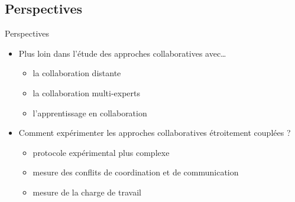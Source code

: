\documentclass[english,french,dvips,10pt]{mybeamer}
\begin{document}
	\subsection{Perspectives}
	\begin{myframe}[label={fra-Perspectives}]{Perspectives}
		\begin{itemize}
				\vfill
			\item Plus loin dans l'étude des approches collaboratives avec\dots
				\begin{itemize}
					\item la collaboration distante
					\item la collaboration multi-experts
					\item l'apprentissage en collaboration
				\end{itemize}
				\vfill
			\item Comment expérimenter les approches collaboratives étroitement couplées ?
				\begin{itemize}
					\item protocole expérimental plus complexe
					\item mesure des conflits de coordination et de communication
					\item mesure de la charge de travail
				\end{itemize}
				\vfill
		\end{itemize}
	\end{myframe}
\end{document}
